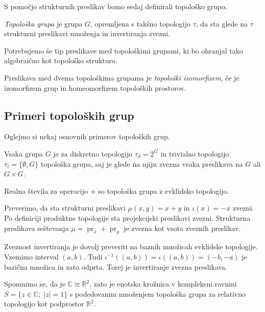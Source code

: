 \documentclass[mat1]{fmfdelo}
\newcommand{\R}{\mathbb R}
\newcommand{\C}{\mathbb C}
\DeclareMathOperator{\pr}{pr}
\begin{document}
S pomočjo strukturnih preslikav bomo sedaj definirali topološko grupo.
\begin{definicija}\label{def:topgrupa}
\emph{Topološka grupa} je grupa $G$, opremljena s takšno topologijo $\tau$, da sta glede na $\tau$ strukturni preslikavi množenja in invertiranja zvezni. 
\end{definicija}

Potrebujemo še tip preslikave med topološkimi grupami, ki bo ohranjal tako algebraično kot topološko strukturo.
\begin{definicija}\label{def:topizo}
Preslikava med dvema topološkima grupama je \emph{to\-po\-loš\-ki izo\-mor\-fi\-zem}, če je izomorfizem grup in homeomorfizem topoloških prostorov.
\end{definicija}


\subsection{Primeri topoloških grup}
Oglejmo si nekaj osnovnih primerov topoloških grup.
\begin{primer}
	Vsaka grupa $G$ je za diskretno topologijo $\tau_d = 2^G$ in trivialno topologijo $\tau_t = \lbrace \emptyset, G \rbrace$ topološka grupa, saj je glede na njiju zvezna vsaka preslikava na $G$ ali $G \times G$.
\end{primer}

\begin{primer}
	Realna števila za operacijo $+$ so topološka grupa z evklidsko topologijo.
	
	Preverimo, da sta strukturni preslikavi $\mu(x, y) = x + y$ in $\iota(x) = -x$ zvezni.
	Po definiciji produktne topologije sta projekcijski preslikavi zvezni. Strukturna preslikava seštevanja $\mu = \pr_x + \pr_y$ je zvezna kot vsota zveznih preslikav.
	
	Zveznost invertiranja je dovolj preveriti na baznih množicah evklidske topologije. Vzemimo interval $(a, b)$. Tudi $\iota^{-1}((a, b)) = \iota((a, b)) = (-b, -a)$ je bazična množica in zato odprta. Torej je invertiranje zvezna preslikava.
\end{primer}

\begin{primer}
	Spomnimo se, da je $\C \cong \R^2$, zato je
	enotska krožnica v kompleksni ravnini $S = \lbrace z \in \C ;\; |z| = 1 \rbrace$ s podedovanim množenjem topološka grupa za relativno topologijo kot podprostor $\R^2$.
\end{primer}
\end{document}
